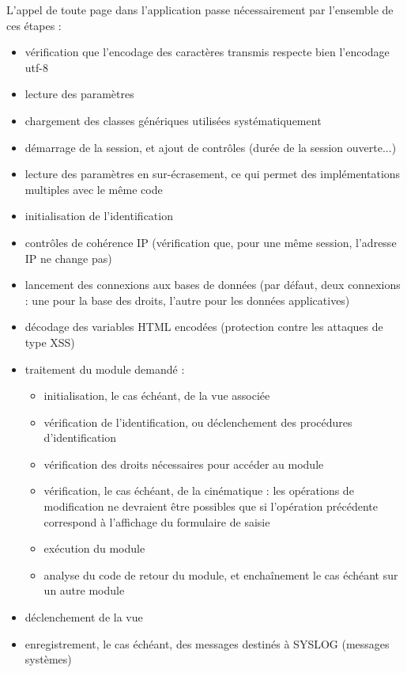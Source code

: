 L'appel de toute page dans l'application passe nécessairement par l'ensemble de ces étapes :
\begin{itemize}
\item vérification que l'encodage des caractères transmis respecte bien l'encodage utf-8
\item lecture des paramètres
\item chargement des classes génériques utilisées systématiquement
\item démarrage de la session, et ajout de contrôles (durée de la session ouverte...)
\item lecture des paramètres en sur-écrasement, ce qui permet des implémentations multiples avec le même code
\item initialisation de l'identification
\item contrôles de cohérence IP (vérification que, pour une même session, l'adresse IP ne change pas)
\item lancement des connexions aux bases de données (par défaut, deux connexions : une pour la base des droits, l'autre pour les données applicatives)
\item décodage des variables HTML encodées (protection contre les attaques de type XSS)
\item traitement du module demandé :
\begin{itemize}
\item initialisation, le cas échéant, de la vue associée 
\item vérification de l'identification, ou déclenchement des procédures d'identification
\item vérification des droits nécessaires pour accéder au module
\item vérification, le cas échéant, de la cinématique : les opérations de modification ne devraient être possibles que si l'opération précédente correspond à l'affichage du formulaire de saisie
\item exécution du module
\item analyse du code de retour du module, et enchaînement le cas échéant sur un autre module
\end{itemize}
\item déclenchement de la vue 
\item enregistrement, le cas échéant, des messages destinés à SYSLOG (messages systèmes)
\end{itemize}

